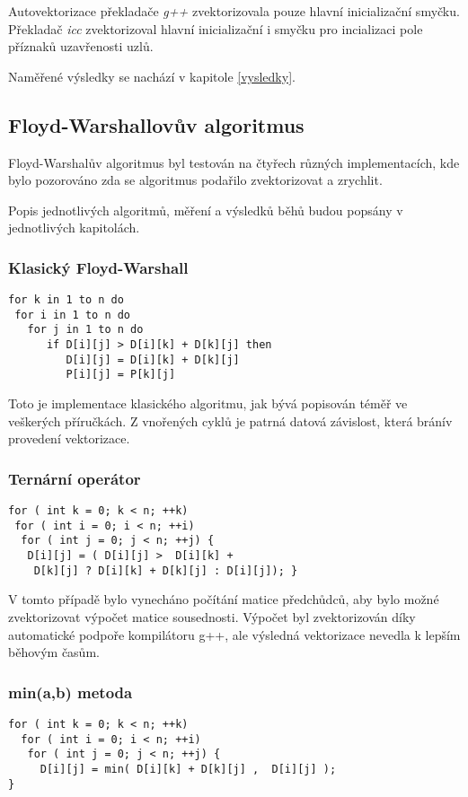 \documentclass[a4paper,11pt]{article}
\begin{document}
Autovektorizace překladače \textit{g++} zvektorizovala pouze hlavní inicializační smyčku. Překladač
\textit{icc} zvektorizoval hlavní inicializační i smyčku pro incializaci pole příznaků uzavřenosti uzlů.

Naměřené výsledky se nachází v kapitole \ref{vysledky}.

\subsection{Floyd-Warshallovův algoritmus}
Floyd-Warshalův algoritmus byl testován na čtyřech různých implementacích, kde bylo pozorováno zda
se algoritmus podařilo zvektorizovat a zrychlit.

Popis jednotlivých algoritmů, měření a výsledků běhů budou popsány v jednotlivých kapitolách.

\subsubsection{Klasický Floyd-Warshall}
\lstset {language=C++}
\begin{lstlisting}
for k in 1 to n do
 for i in 1 to n do
   for j in 1 to n do
      if D[i][j] > D[i][k] + D[k][j] then
         D[i][j] = D[i][k] + D[k][j]
         P[i][j] = P[k][j]
\end{lstlisting}

Toto je implementace klasického algoritmu, jak bývá popisován téměř ve veškerých příručkách.
Z vnořených cyklů je patrná datová závislost, která bránív provedení vektorizace.

\subsubsection{Ternární operátor}

\lstset {language=C++}
\begin{lstlisting}
for ( int k = 0; k < n; ++k)
 for ( int i = 0; i < n; ++i) 
  for ( int j = 0; j < n; ++j) {
   D[i][j] = ( D[i][j] >  D[i][k] +
    D[k][j] ? D[i][k] + D[k][j] : D[i][j]); }
\end{lstlisting}

V tomto případě bylo vynecháno počítání matice předchůdců, aby bylo možné zvektorizovat výpočet matice
sousednosti. Výpočet byl zvektorizován díky automatické podpoře kompilátoru g++, ale výsledná vektorizace
nevedla k lepším běhovým časům.

\subsubsection{min(a,b) metoda}
\lstset {language=C++}
\begin{lstlisting}
for ( int k = 0; k < n; ++k)
  for ( int i = 0; i < n; ++i) 
   for ( int j = 0; j < n; ++j) {
     D[i][j] = min( D[i][k] + D[k][j] ,  D[i][j] );
}
\end{lstlisting}
\end{document}
